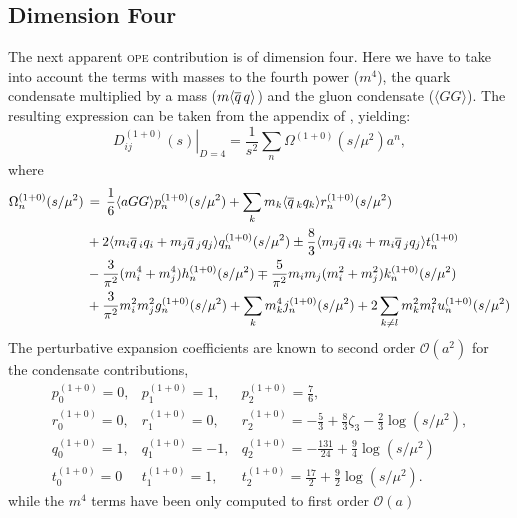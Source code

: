 \documentclass[../../index.tex]{subfiles}
\begin{document}
\subsection{Dimension Four}
The next apparent \textsc{ope} contribution is of dimension four. Here we have
to take into account the terms with masses to the fourth power (\(m^4\)), the
quark condensate multiplied by a mass (\(m \langle \overline{q}\, q \rangle\)) and the
gluon condensate (\(\langle GG \rangle\)). The resulting expression can be taken
from the appendix of \cite{Pich1999}, yielding:
\begin{equation}
  \left. D_{ij}^{(1+0)}(s) \right\rvert_{D=4} = \frac{1}{s^2} \sum_n \Omega^{(1+0)}(s/\mu^2)a^n,
\end{equation}
where
\begin{equation}
  \begin{split}
    \Omega_n^{(1+0)} (s/\mu^2) &\,=\, \frac{1}{6}\langle aGG \rangle p_n^{(1+0)}(s/\mu^2) + \sum_k m_k \langle \overline{q}\,_k q_k \rangle r_n^{(1+0)}(s/\mu^2) \\
    &\,+ 2\langle m_i \overline{q}\,_i q_i + m_j \overline{q}\,_j q_j \rangle q_n^{(1+0)} (s/\mu^2) \pm \frac{8}{3} \langle m_j \overline{q}\,_i q_i + m_i \overline{q}\,_j q_j \rangle t_n^{(1+0)} \\
    &\,- \frac{3}{\pi^2} (m_i^4 + m_j^4) h_n^{(1+0)} (s/\mu^2) \mp \frac{5}{\pi^2} m_i m_j (m_i^2 + m_j^2) k_n^{(1+0)}(s/\mu^2)\\
    &\,+ \frac{3}{\pi^2} m_i^2 m_j^2 g_n^{(1+0)}(s/\mu^2) + \sum_k m_k^4
    j_n^{(1+0)}(s/\mu^2) + 2 \sum_{k \neq l} m_k^2 m_l^2 u_n^{(1+0)}(s/\mu^2)
  \end{split}
\end{equation}
The perturbative expansion coefficients are known to second order
\(\mathcal{O}(a^2)\) for the condensate contributions,
\begin{equation}
  \begin{array}{lll}
    p_0^{(1+0)}=0, & p_1^{(1+0)}=1, & p_2^{(1+0)}=\frac{7}{6}, \\
    r_0^{(1+0)}=0, & r_1^{(1+0)}=0, & r_2^{(1+0)}=-\frac{5}{3}+\frac{8}{3}\zeta_3-\frac{2}{3}\log(s/\mu^2), \\
    q_0^{(1+0)}=1, & q_1^{(1+0)}=-1, & q_2^{(1+0)}=-\frac{131}{24}+\frac{9}{4}\log(s/\mu^2) \\
    t_0^{(1+0)}=0 & t_1^{(1+0)}=1, & t_2^{(1+0)}=\frac{17}{2}+\frac{9}{2}\log(s/\mu^2).
  \end{array}
\end{equation}
while the \(m^4\) terms have been only computed to first order \(\mathcal{O}(a)\)
\end{document}
